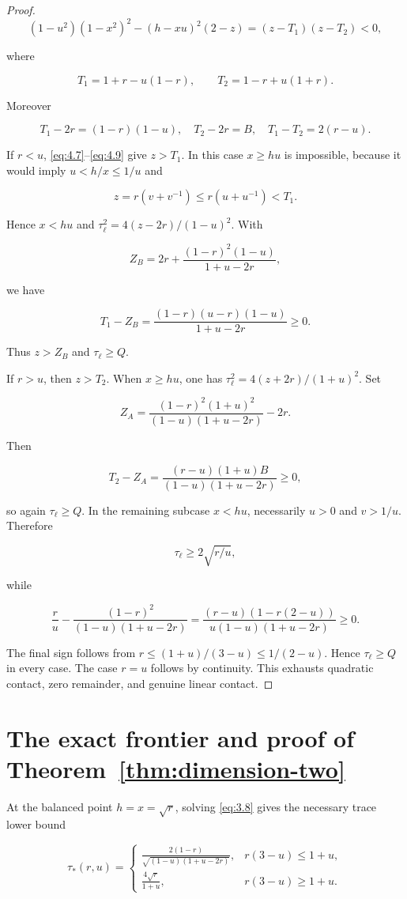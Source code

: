 \documentclass[11pt]{article}
\begin{document}
\begin{proof}
\[
(1-u^2)(1-x^2)^2-(h-xu)^2(2-z)
=(z-T_1)(z-T_2)<0,
\tag{4.7}\label{eq:4.7}
\]

where

\[
T_1=1+r-u(1-r),\qquad T_2=1-r+u(1+r).
\tag{4.8}\label{eq:4.8}
\]

Moreover

\[
T_1-2r=(1-r)(1-u),\quad
T_2-2r=B,\quad
T_1-T_2=2(r-u).
\tag{4.9}\label{eq:4.9}
\]

If $r<u$, \eqref{eq:4.7}--\eqref{eq:4.9} give $z>T_1$. In this case $x\ge hu$ is impossible,
because it would imply $u<h/x\le1/u$ and

\[
z=r(v+v^{-1})\le r(u+u^{-1})<T_1.
\]

Hence $x<hu$ and $\tau_\ell^2=4(z-2r)/(1-u)^2$. With

\[
Z_B=2r+\frac{(1-r)^2(1-u)}{1+u-2r},
\]

we have

\[
T_1-Z_B=
\frac{(1-r)(u-r)(1-u)}{1+u-2r}\ge0.
\]

Thus $z>Z_B$ and $\tau_\ell\ge Q$.

If $r>u$, then $z>T_2$. When $x\ge hu$, one has
$\tau_\ell^2=4(z+2r)/(1+u)^2$. Set

\[
Z_A=\frac{(1-r)^2(1+u)^2}
{(1-u)(1+u-2r)}-2r.
\]

Then

\[
T_2-Z_A=
\frac{(r-u)(1+u)B}{(1-u)(1+u-2r)}\ge0,
\]

so again $\tau_\ell\ge Q$. In the remaining subcase $x<hu$, necessarily
$u>0$ and $v>1/u$. Therefore

\[
\tau_\ell\ge2\sqrt{r/u},
\]

while

\[
\frac ru-\frac{(1-r)^2}{(1-u)(1+u-2r)}
=\frac{(r-u)(1-r(2-u))}
{u(1-u)(1+u-2r)}\ge0.
\]

The final sign follows from $r\le(1+u)/(3-u)\le1/(2-u)$. Hence
$\tau_\ell\ge Q$ in every case. The case $r=u$ follows by continuity. This
exhausts quadratic contact, zero remainder, and genuine linear contact.
\end{proof}


\section{The exact frontier and proof of Theorem~\ref{thm:dimension-two}}


At the balanced point $h=x=\sqrt r$, solving \eqref{eq:3.8} gives the necessary trace
lower bound

\[
\tau_*(r,u)=
\begin{cases}
\displaystyle
\frac{2(1-r)}{\sqrt{(1-u)(1+u-2r)}},
&r(3-u)\le1+u,\\[9pt]
\displaystyle
\frac{4\sqrt r}{1+u},
&r(3-u)\ge1+u.
\end{cases}
\tag{5.1}\label{eq:5.1}
\]
\end{document}
